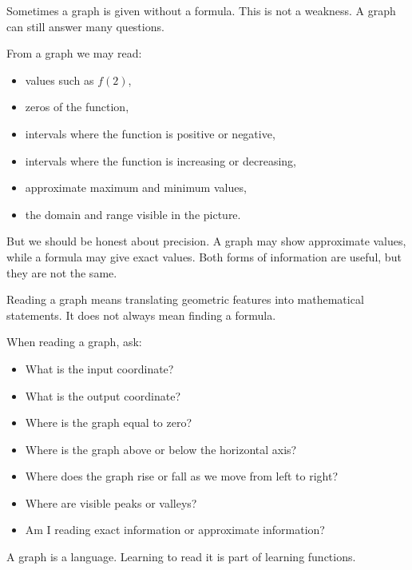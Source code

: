 Sometimes a graph is given without a formula. This is not a weakness. A graph can still answer many questions.

From a graph we may read:
\begin{itemize}
\item values such as \(f(2)\),
\item zeros of the function,
\item intervals where the function is positive or negative,
\item intervals where the function is increasing or decreasing,
\item approximate maximum and minimum values,
\item the domain and range visible in the picture.
\end{itemize}

But we should be honest about precision. A graph may show approximate values, while a formula may give exact values. Both forms of information are useful, but they are not the same.

\begin{remarkbox}
Reading a graph means translating geometric features into mathematical statements. It does not always mean finding a formula.
\end{remarkbox}

\begin{summarybox}
When reading a graph, ask:
\begin{itemize}
\item What is the input coordinate?
\item What is the output coordinate?
\item Where is the graph equal to zero?
\item Where is the graph above or below the horizontal axis?
\item Where does the graph rise or fall as we move from left to right?
\item Where are visible peaks or valleys?
\item Am I reading exact information or approximate information?
\end{itemize}
\end{summarybox}

A graph is a language. Learning to read it is part of learning functions.